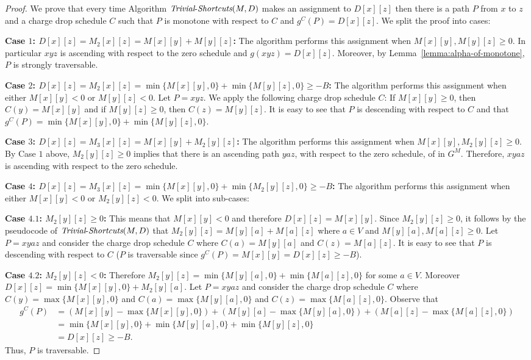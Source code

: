 \documentclass[11pt]{article}
\newcommand{\Trivial}{\mbox{{\it Trivial}-{\it Shortcuts}}}
\begin{document}
\begin{proof}
    We prove that every time Algorithm $\Trivial(M,D)$ makes an assignment to $D[x][z]$ then there is a path $P$ from $x$ to $z$ and a charge drop schedule $C$ such that $P$ is monotone with respect to $C$ and $g^C(P) = D[x][z]$. We split the proof into cases:

    \textbf{Case $1$: $D[x][z] = M_2[x][z] = M[x][y]+M[y][z]$:}
    The algorithm performs this assignment when $M[x][y],M[y][z]\ge 0$. In particular $xyz$ is ascending with respect to the zero schedule and $g(xyz)=D[x][z]$. Moreover, by Lemma~\ref{lemma:alpha-of-monotone}, $P$ is strongly traversable.

    \textbf{Case $2$: $D[x][z] = M_2[x][z]  = \min\{M[x][y],0\}+\min\{M[y][z],0\} \ge -B$:}
    The algorithm performs this assignment when either $M[x][y]<0$ or $M[y][z] < 0$. Let $P = xyz$. We apply the following charge drop schedule $C$: If $M[x][y] \ge 0$, then $C(y)=M[x][y]$ and if $M[y][z] \ge 0$, then $C(z)=M[y][z]$. It is easy to see that $P$ is descending with respect to $C$ and that $g^C(P) = \min\{M[x][y],0\}+\min\{M[y][z],0\}$.

    \textbf{Case $3$: $D[x][z] = M_3[x][z]  = M[x][y]+M_2[y][z]$:}
    The algorithm performs this assignment when $M[x][y],M_2[y][z]\ge 0$. By Case $1$ above, $M_2[y][z]\ge 0$ implies that there is an ascending path $yaz$, with respect to the zero schedule, of in $G^M$. Therefore, $xyaz$ is ascending with respect to the zero schedule. 

    \textbf{Case $4$: $D[x][z] = M_3[x][z]  = \min\{M[x][y],0\}+\min\{M_2[y][z],0\}\ge -B$:}
    The algorithm performs this assignment when either $M[x][y]<0$ or $M_2[y][z] < 0$.
    We split into sub-cases:
    
    \textbf{Case $4.1$: $M_2[y][z] \ge 0$:}
    This means that $M[x][y]<0$ and therefore $D[x][z] = M[x][y]$. Since $M_2[y][z] \ge 0$, it follows by the pseudocode of $\Trivial(M,D)$ that $M_2[y][z] = M[y][a] + M[a][z]$ where $a\in V $ and $M[y][a],M[a][z]\ge 0$. Let $P = xyaz$ and consider the charge drop schedule $C$ where $C(a) = M[y][a]$ and $C(z) = M[a][z]$. It is easy to see that $P$ is descending with respect to $C$ ($P$ is traversable since $g^C(P) = M[x][y] = D[x][z]\ge -B$).
    
    \textbf{Case $4.2$: $M_2[y][z] < 0$:}
    Therefore $M_2[y][z] = \min \{M[y][a],0 \} + \min \{M[a][z],0 \}$ for some $a\in V$. Moreover $D[x][z] = \min \{M[x][y],0 \} + M_2[y][a]$. Let $P = xyaz$ and consider the charge drop schedule $C$ where $C(y) =  \max \{M[x][y],0 \}$ and $C(a) = \max \{M[y][a],0 \}$ and $C(z) =\max \{M[a][z],0 \}$. Observe that
    \begin{align*}
        g^C(P) &= (M[x][y] - \max \{M[x][y],0 \}) + 
        (M[y][a] - \max \{M[y][a],0 \}) + 
        (M[a][z] - \max \{M[a][z],0 \}) 
        \\ &= \min \{M[x][y],0 \} + \min \{M[y][a],0 \} + \min \{M[y][z],0 \} \\
        &= D[x][z] \ge -B.
    \end{align*}
    Thus, $P$ is traversable.
\end{proof}
\end{document}
